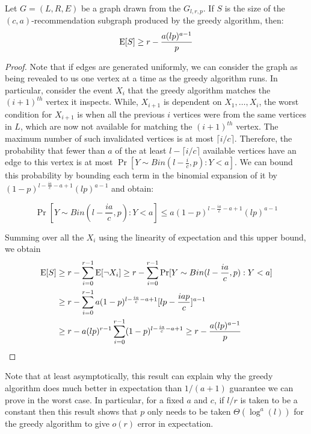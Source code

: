 \begin{thm}
Let $G=(L,R,E)$ be a graph drawn from the $G_{l,r,p}$. If $S$ is the size of the $(c,a)$-recommendation subgraph produced by the greedy algorithm, then:
\[ \text{E}[S] \geq r - \frac{a(lp)^{a-1}}{p}\]
\end{thm}
\begin{proof}
Note that if edges are generated uniformly, we can consider the
graph as being revealed to us one vertex at a time as the greedy
algorithm runs. In particular, consider the event $X_i$ that the
greedy algorithm matches the $(i+1)^{th}$ vertex it inspects. While,
$X_{i+1}$ is dependent on $X_1,\ldots, X_i$, the worst condition for
$X_{i+1}$ is when all the previous $i$ vertices were from the same
vertices in $L$, which are now not available for matching the
$(i+1)^{th}$ vertex. The maximum number of such invalidated vertices
is at most $\lceil i/c \rceil$. Therefore, the probability that fewer
than $a$ of the at least $l-\lceil i/c \rceil $ available 
vertices have an edge to this vertex is at most $\Pr[Y\sim Bin(l-\frac{i}{c},p): Y < a]$.
We can bound this probability by bounding each term in the binomial
expansion of it by $(1-p)^{l-\frac{ia}{c}-a+1}(lp)^{a-1}$ and obtain:

\[ \Pr[Y\sim Bin(l-\frac{ia}{c},p): Y < a] \leq a(1-p)^{l-\frac{ia}{c}-a+1}(lp)^{a-1}\]

Summing over all the $X_i$ using the linearity of expectation and this upper bound,
we obtain
\begin{align*}
      \text{E}[S]
&\geq r - \sum_{i=0}^{r-1} \text{E}[\lnot X_i] \geq r - \sum_{i=0}^{r-1} \Pr[Y \sim Bin(l-\frac{ia}{c},p): Y < a] \\
&\geq r - \sum_{i=0}^{r-1}a(1-p)^{l-\frac{ia}{c}-a+1}[lp-\frac{iap}{c}]^{a-1} \\
&\geq r - a(lp)^{r-1}\sum_{i=0}^{r-1}(1-p)^{l-\frac{ia}{c}-a+1} \geq r - \frac{a(lp)^{a-1}}{p}
\end{align*}
\end{proof} 

Note that at least asymptotically, this result can explain why the greedy
algorithm does much better in expectation than $1/(a+1)$ guarantee we 
can prove in the worst case. In particular, for a fixed $a$ and $c$, if
$l/r$ is taken to be a constant then this result shows that $p$ only
needs to be taken $\Theta(\log^{a}(l))$ for the greedy algorithm to
give $o(r)$ error in expectation. 
